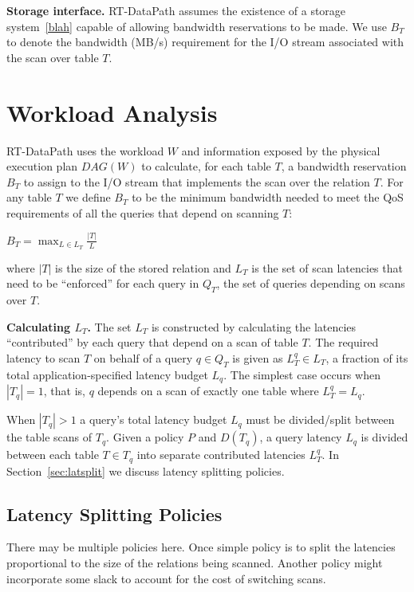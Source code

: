 \documentclass{sig-alternate}
\begin{document}
{\bf Storage interface.} RT-DataPath assumes the existence of a storage
system~\ref{blah} capable of allowing bandwidth reservations to be made. We
use $B_T$ to denote the bandwidth (MB/s) requirement for the I/O stream
associated with the scan over table $T$.

\section{Workload Analysis}

RT-DataPath uses the workload $W$ and information exposed by the physical
execution plan $DAG(W)$ to calculate, for each table $T$, a bandwidth
reservation $B_T$ to assign to the I/O stream that implements the scan over
the relation $T$. For any table $T$ we define $B_T$ to be the minimum
bandwidth needed to meet the QoS requirements of all the queries that depend
on scanning $T$:

\begin{center}
$B_T = \max_{L \in L_T} \frac{|T|}{L}$
\end{center}

\noindent
where $|T|$ is the size of the stored relation and $L_T$ is the set of scan
latencies that need to be ``enforced'' for each query in $Q_T$, the set of
queries depending on scans over $T$.

{\bf Calculating $L_T$.} The set $L_T$ is constructed by calculating the
latencies ``contributed'' by each query that depend on a scan of table $T$.
The required latency to scan $T$ on behalf of a query $q \in Q_T$ is given as
$L^q_T \in L_T$, a fraction of its total application-specified latency budget
$L_q$. The simplest case occurs when $|T_q| = 1$, that is, $q$ depends on a
scan of exactly one table where $L^q_T = L_q$.

When $|T_q| > 1$ a query's total latency budget $L_q$ must be divided/split
between the table scans of $T_q$. Given a policy $P$ and $D(T_q)$, a query
latency $L_q$ is divided between each table $T \in T_q$ into separate
contributed latencies $L^q_T$. In Section~\ref{sec:latsplit} we discuss
latency splitting policies.

\subsection{Latency Splitting Policies}

There may be multiple policies here. Once simple policy is to split the
latencies proportional to the size of the relations being scanned. Another
policy might incorporate some slack to account for the cost of switching
scans.
\end{document}
